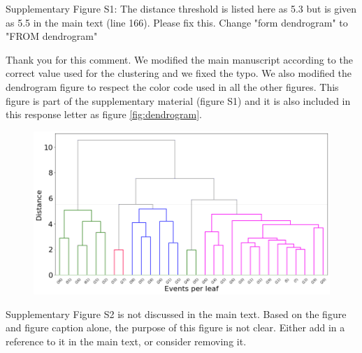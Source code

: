 \documentclass[10pt]{extarticle}
\begin{document}
\begin{ReviewerComment}{2}
\noindent 
Supplementary Figure S1: The distance threshold is listed here as 5.3 but is given as 5.5 in the main text (line 166). Please fix this. Change "form dendrogram" to "FROM dendrogram"
\end{ReviewerComment}


\begin{Answer}
Thank you for this comment. We modified the main manuscript according to the correct value used for the clustering and we fixed the typo. We also modified the dendrogram figure to respect the color code used in all the other figures. This figure is part of the supplementary material (figure S1) and it is also included in this response letter as figure \ref{fig:dendrogram}.
\begin{figure}[!h]
\begin{center}
 \includegraphics[width=1\linewidth]{dendrogram_balsorano.png} 
\end{center}
\label{fig:fig3_improved}
\end{figure}
 \WorkInProgressRevTask
\end{Answer}
%
%



\begin{ReviewerComment}{2}
\noindent 
Supplementary Figure S2 is not discussed in the main text. Based on the figure and figure caption alone, the purpose of this figure is not clear. Either add in a reference to it in the main text, or consider removing it.

\end{ReviewerComment}


\begin{Answer}
 \WorkInProgressRevTask
\end{Answer}
%
%
\end{document}
